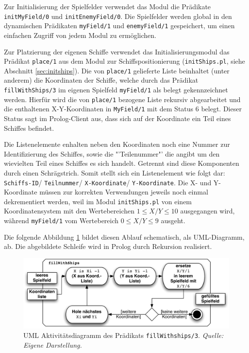 	Zur Initialisierung der Spielfelder verwendet das Modul die Prädikate \texttt{initMyField/0} und \texttt{initEnemyField/0}.
	Die Spielfelder werden global in den dynamischen Prädikaten \texttt{myField/1} und \texttt{enemyField/1}
	gespeichert, um einen einfachen Zugriff von jedem Modul zu ermöglichen. 
	 
	Zur Platzierung der eigenen Schiffe verwendet das Initialisierungsmodul das Prädikat \texttt{place/1} aus dem Modul zur 
	Schiffspositionierung (\texttt{initShips.pl}, siehe Abschnitt \ref{sec:initships}).
	Die von \texttt{place/1} gelieferte Liste beinhaltet (unter anderem) die Koordinaten der Schiffe, welche durch das Prädikat 
	\texttt{fillWithShips/3} im eigenen Spielfeld \texttt{myField/1} als belegt gekennzeichnet werden. Hierfür wird 
	die von \texttt{place/1} bezogene Liste rekursiv abgearbeitet und die enthaltenen X-Y-Koordinaten in \texttt{MyField/1} mit dem 
	Status 6 belegt. Dieser Status sagt im Prolog-Client aus, dass sich auf der Koordinate ein Teil eines Schiffes befindet.
	
	Die Listenelemente enhalten neben den Koordinaten noch eine Nummer zur Identifizierung des Schiffes, sowie die "'Teilenummer"' 
	die angibt um den wievielten Teil eines Schiffes es sich handelt. Getrennt sind diese Komponenten durch einen Schrägstrich. Somit 
	stellt sich ein Listenelement wie folgt dar: \texttt{Schiffs-ID}/ \texttt{Teilnummer}/ \texttt{X-Koordinate}/ \texttt{Y-Koordinate}.
	Die X- und Y-Koordinate müssen zur korrekten Verwendungen jeweils noch einmal dekrementiert werden, weil im Modul \texttt{initShips.pl} von 
	einem Koordinatensystem mit den Wertebereichen $1\le X/Y\le 10$ ausgegangen wird, während \texttt{myField/1} vom Wertebereich $0\le X/Y\le 9$ ausgeht.
	
	Die folgende Abbildung \ref{fig:fillwithShips3} bildet diesen Ablauf schematisch, als UML-Diagramm, ab. Die abgebildete Schleife 
	wird in Prolog durch Rekursion realisiert.
	\begin{figure}[H] %
		\centering
		\includegraphics[width=.9\textwidth]{images/fillWithShips.pdf}
		\caption{UML Aktivitätsdiagramm des Prädikats \texttt{fillWithships/3}. \emph{Quelle: Eigene Darstellung.}}
		\label{fig:fillwithShips3}
	\end{figure}

